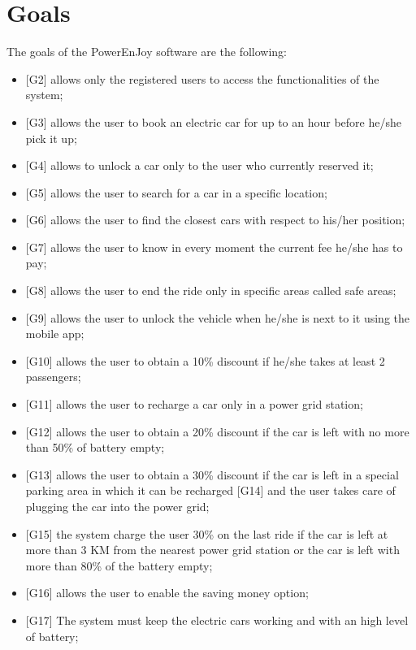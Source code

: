 \section{Goals}
The goals of the PowerEnJoy software are the following:
\begin{itemize}
    \item {[G2]} allows only the registered users to access the functionalities of the system;
	\item {[G3]} allows the user to book an electric car for up to an hour before he/she pick it up;
	\item {[G4]} allows to unlock a car only to the user who currently reserved it;
	\item {[G5]} allows the user to search for a car in a specific location; 
	\item {[G6]} allows the user to find the closest cars with respect to his/her position; 
	\item {[G7]} allows the user to know in every moment the current fee he/she has to pay;
	\item {[G8]} allows the user to end the ride only in specific areas called safe areas;
	\item {[G9]} allows the user to unlock the vehicle when he/she is next to it using the mobile app;
	\item {[G10]} allows the user to obtain a 10\% discount if he/she takes at least 2 passengers;
	\item {[G11]} allows the user to recharge a car only in a power grid station;
	\item {[G12]} allows the user to obtain a 20\% discount if the car is left with no more than 50\% of battery empty;
	\item {[G13]} allows the user to obtain a 30\% discount if the car is left in a special parking area in which it can be recharged {[G14]} and the user takes care of plugging the car into the power grid;
	\item {[G15]} the system charge the user 30\% on the last ride if the car is left at more than 3 KM from the nearest power grid station or the car is left with more than 80\% of the battery empty;
	\item {[G16]} allows the user to enable the saving money option;
	\item {[G17]} The system must keep the electric cars working and with an high level of battery;
	
	
\end{itemize}
